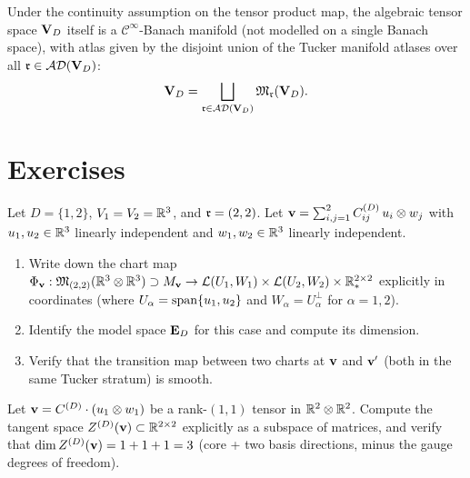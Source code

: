 \begin{corollary}
\label{cor:VD_manifold}
Under the continuity assumption on the tensor product map, the algebraic
tensor space $\mathbf{V}_D$ itself is a $\mathcal{C}^\infty$-Banach manifold
(not modelled on a single Banach space), with atlas given by the
disjoint union of the Tucker manifold atlases over all $\mathfrak{r} \in \mathcal{AD}(\mathbf{V}_D)$:
\begin{equation*}
    \mathbf{V}_D = \bigsqcup_{\mathfrak{r} \in \mathcal{AD}(\mathbf{V}_D)} \mathfrak{M}_{\mathfrak{r}}(\mathbf{V}_D).
\end{equation*}
\end{corollary}

\section{Exercises}
\label{sec:tucker_manifold:exercises}

\begin{exercise}
Let $D = \{1,2\}$, $V_1 = V_2 = \mathbb{R}^3$, and $\mathfrak{r} = (2,2)$.
Let $\mathbf{v} = \sum_{i,j=1}^2 C^{(D)}_{ij}\, u_i \otimes w_j$ with
$u_1, u_2 \in \mathbb{R}^3$ linearly independent and $w_1, w_2 \in \mathbb{R}^3$
linearly independent.
\begin{enumerate}
\item[\textup{(a)}] Write down the chart map
    $\Phi_{\mathbf{v}}: \mathfrak{M}_{(2,2)}(\mathbb{R}^3 \otimes \mathbb{R}^3) \supset M_{\mathbf{v}}
    \to \mathcal{L}(U_1, W_1) \times \mathcal{L}(U_2, W_2) \times \mathbb{R}^{2\times 2}_*$
    explicitly in coordinates (where $U_\alpha = \mathrm{span}\{u_1,u_2\}$
    and $W_\alpha = U_\alpha^\perp$ for $\alpha = 1,2$).
\item[\textup{(b)}] Identify the model space $\mathbf{E}_{D}$ for this
    case and compute its dimension.
\item[\textup{(c)}] Verify that the transition map between two charts
    at $\mathbf{v}$ and $\mathbf{v}'$ (both in the same Tucker stratum) is smooth.
\end{enumerate}
\end{exercise}

\begin{exercise}
Let $\mathbf{v} = C^{(D)} \cdot (u_1 \otimes w_1)$ be a rank-$(1,1)$ tensor
in $\mathbb{R}^2 \otimes \mathbb{R}^2$. Compute the tangent space
$Z^{(D)}(\mathbf{v}) \subset \mathbb{R}^{2\times 2}$ explicitly as a subspace of matrices,
and verify that $\dim Z^{(D)}(\mathbf{v}) = 1 + 1 + 1 = 3$ (core + two basis
directions, minus the gauge degrees of freedom).
\end{exercise}

